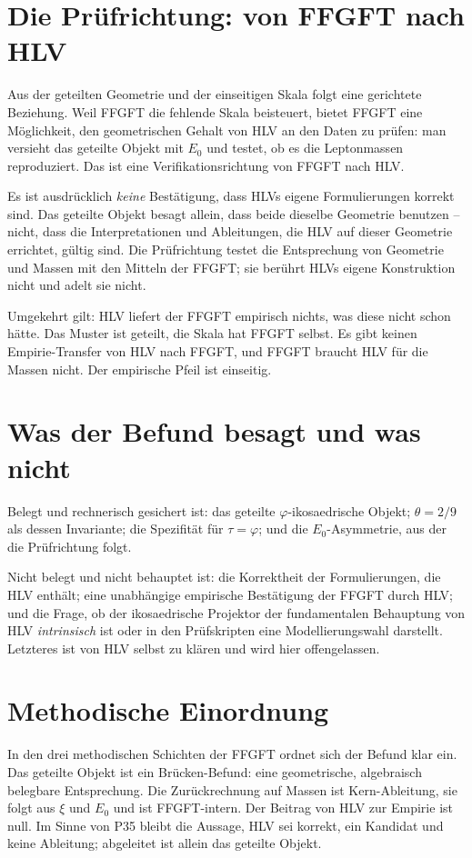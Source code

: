 \section{Die Prüfrichtung: von FFGFT nach HLV}
Aus der geteilten Geometrie und der einseitigen Skala folgt eine gerichtete Beziehung. Weil
FFGFT die fehlende Skala beisteuert, bietet FFGFT eine Möglichkeit, den geometrischen Gehalt
von HLV an den Daten zu prüfen: man versieht das geteilte Objekt mit $E_0$ und testet, ob es
die Leptonmassen reproduziert. Das ist eine Verifikationsrichtung von FFGFT nach HLV.

Es ist ausdrücklich \emph{keine} Bestätigung, dass HLVs eigene Formulierungen korrekt sind. Das
geteilte Objekt besagt allein, dass beide dieselbe Geometrie benutzen -- nicht, dass die
Interpretationen und Ableitungen, die HLV auf dieser Geometrie errichtet, gültig sind. Die
Prüfrichtung testet die Entsprechung von Geometrie und Massen mit den Mitteln der FFGFT; sie
berührt HLVs eigene Konstruktion nicht und adelt sie nicht.

Umgekehrt gilt: HLV liefert der FFGFT empirisch nichts, was diese nicht schon hätte. Das Muster
ist geteilt, die Skala hat FFGFT selbst. Es gibt keinen Empirie-Transfer von HLV nach FFGFT,
und FFGFT braucht HLV für die Massen nicht. Der empirische Pfeil ist einseitig.

\section{Was der Befund besagt und was nicht}
Belegt und rechnerisch gesichert ist: das geteilte $\varphi$-ikosaedrische Objekt; $\theta=2/9$
als dessen Invariante; die Spezifität für $\tau=\varphi$; und die $E_0$-Asymmetrie, aus der die
Prüfrichtung folgt.

Nicht belegt und nicht behauptet ist: die Korrektheit der Formulierungen, die HLV enthält; eine
unabhängige empirische Bestätigung der FFGFT durch HLV; und die Frage, ob der ikosaedrische
Projektor der fundamentalen Behauptung von HLV \emph{intrinsisch} ist oder in den
Prüfskripten eine Modellierungswahl darstellt. Letzteres ist von HLV selbst zu klären und wird
hier offengelassen.

\section{Methodische Einordnung}
In den drei methodischen Schichten der FFGFT ordnet sich der Befund klar ein. Das geteilte
Objekt ist ein Brücken-Befund: eine geometrische, algebraisch belegbare Entsprechung. Die
Zurückrechnung auf Massen ist Kern-Ableitung, sie folgt aus $\xi$ und $E_0$ und ist
FFGFT-intern. Der Beitrag von HLV zur Empirie ist null. Im Sinne von P35 bleibt die Aussage,
HLV sei korrekt, ein Kandidat und keine Ableitung; abgeleitet ist allein das geteilte Objekt.

